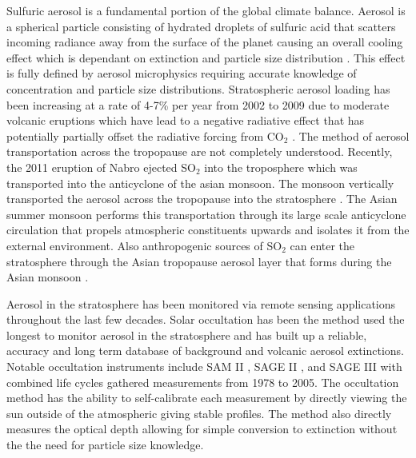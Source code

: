 \documentclass[12pt]{article}
\begin{document}
Sulfuric aerosol is a fundamental portion of the global climate balance. Aerosol is a spherical particle consisting of hydrated droplets of sulfuric acid that scatters incoming radiance away from the surface of the planet causing an overall cooling effect which is dependant on extinction and particle size distribution \citep{Kiehl1993}. This effect is fully defined by aerosol microphysics requiring accurate knowledge of concentration and particle size distributions. Stratospheric aerosol loading has been increasing at a rate of 4-7\% per year from 2002 to 2009 due to moderate volcanic eruptions \citep{Vernier2011} which have lead to a negative radiative effect that has potentially partially offset the radiative forcing from CO$_{2}$ \citep{Solomon2011}.  The method of aerosol transportation across the tropopause are not completely understood. Recently, the 2011 eruption of Nabro ejected  SO$_{2}$ into the troposphere which was transported into the anticyclone of the asian monsoon. The monsoon vertically transported the aerosol across the tropopause into the stratosphere \citep{Bourassa2012c}. The Asian summer monsoon performs this transportation through its large scale anticyclone circulation that propels atmospheric constituents upwards and isolates it from the external environment. Also anthropogenic sources of SO$_{2}$ can enter the stratosphere through the Asian tropopause aerosol layer that forms during the Asian monsoon \citep{Vernier2011, Neely2014}.

Aerosol in the stratosphere has been monitored via remote sensing applications throughout the last few decades. Solar occultation has been the method used the longest to monitor aerosol in the stratosphere and has built up a reliable, accuracy and long term database of background and volcanic aerosol extinctions. Notable occultation instruments include SAM II \citep{McCormick1979}, SAGE II \citep{McCormick1987}, and SAGE III \citep{Thomason2003} with combined life cycles gathered measurements from 1978 to 2005. The occultation method has the ability to self-calibrate each measurement by directly viewing the sun outside of the atmospheric giving stable profiles. The method also directly measures the optical depth allowing for simple conversion to extinction without the the need for particle size knowledge.
\end{document}
